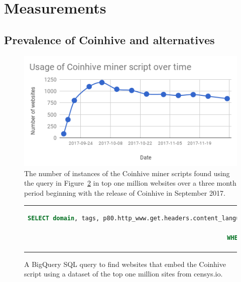 %
%
%
%
%
%

\section{Measurements}

\subsection{Prevalence of Coinhive and alternatives}

\begin{figure}[h]
\centering
\includegraphics[width=\linewidth]{figures/usage_of_coinhive_over_time.png}
\caption{The number of instances of the Coinhive miner scripts found using the query in Figure~\ref{lst:bigquery} in top one million websites over a three month period beginning with the release of Coinhive in September 2017.\label{fig:topmil}}
\end{figure}


\begin{figure}[t]
\begin{tabular}{c}
\begin{lstlisting}[language=sql]
SELECT domain, tags, p80.http_www.get.headers.content_language, p80.http_www.get.headers.server, p80.http.get.headers.x_powered_by, p80.http.get.title, p80.http_www.get.body as wwwbody, p80.http.get.body as plainbody 
FROM censys-io.domain_public.20171123
WHERE STRPOS(p80.http.get.body, coinhive.min.js) > 0 or STRPOS(p80.http_www.get.body, coinhive.min.js) >0)
\end{lstlisting}
\end{tabular}
\caption{A BigQuery SQL query to find websites that embed the Coinhive script using a dataset of the top one million sites from censys.io. \label{lst:bigquery}}
\end{figure}


